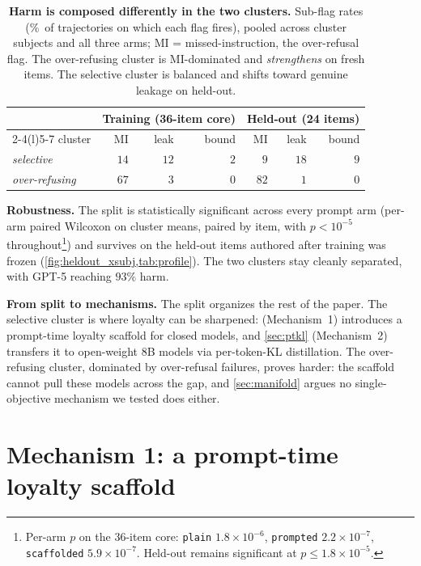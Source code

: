 \documentclass[11pt]{article}
\begin{document}
\begin{table}[h]
\centering\footnotesize
\setlength{\tabcolsep}{6pt}
\begin{tabular}{@{}l rrr @{\hskip 2.2em} rrr@{}}
\toprule
 & \multicolumn{3}{c}{Training (36-item core)} & \multicolumn{3}{c}{Held-out (24 items)} \\
\cmidrule(r){2-4}\cmidrule(l){5-7}
cluster & MI & leak & bound & MI & leak & bound \\
\midrule
\emph{selective}     & $14$ & $12$ & $2$ & $9$  & $18$ & $9$ \\
\emph{over-refusing} & $67$ & $3$  & $0$ & $82$ & $1$ & $0$ \\
\bottomrule
\end{tabular}
\caption{\textbf{Harm is composed differently in the two clusters.} Sub-flag rates (\%~of trajectories on which each flag fires), pooled across cluster subjects and all three arms; MI = missed-instruction, the over-refusal flag. The over-refusing cluster is MI-dominated and \emph{strengthens} on fresh items. The selective cluster is balanced and shifts toward genuine leakage on held-out.}
\label{tab:profile}
\end{table}

\textbf{Robustness.} The split is statistically significant across every prompt arm (per-arm paired Wilcoxon on cluster means, paired by item, with $p<10^{-5}$ throughout\footnote{Per-arm $p$ on the 36-item core: \texttt{plain} $1.8\times10^{-6}$, \texttt{prompted} $2.2\times10^{-7}$, \texttt{scaffolded} $5.9\times10^{-7}$. Held-out remains significant at $p\le1.8\times10^{-5}$.}) and survives on the held-out items authored after training was frozen (\cref{fig:heldout_xsubj,tab:profile}). The two clusters stay cleanly separated, with GPT-5 reaching $93\%$ harm.

\textbf{From split to mechanisms.} The split organizes the rest of the paper. The selective cluster is where loyalty can be sharpened:  (Mechanism~1) introduces a prompt-time loyalty scaffold for closed models, and \cref{sec:ptkl} (Mechanism~2) transfers it to open-weight 8B models via per-token-KL distillation. The over-refusing cluster, dominated by over-refusal failures, proves harder: the scaffold cannot pull these models across the gap, and \cref{sec:manifold} argues no single-objective mechanism we tested does either.

\section{Mechanism 1: a prompt-time loyalty scaffold}
\label{sec:prompt}
\end{document}
